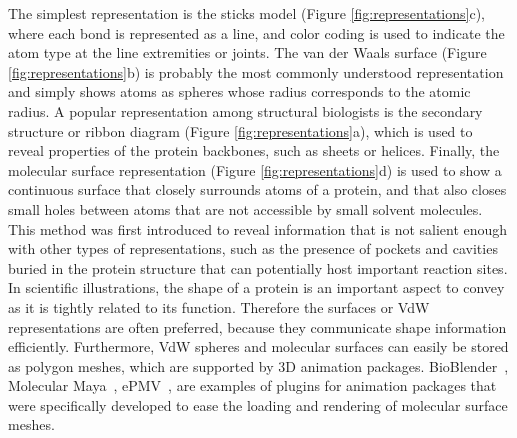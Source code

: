 %	
%	
%	

The simplest representation is the sticks model (Figure \ref{fig:representations}c), where each bond is represented as a line, and color coding is used to indicate the atom type at the line extremities or joints.
The van der Waals surface (Figure \ref{fig:representations}b) is probably the most commonly understood representation and simply shows atoms as spheres whose radius corresponds to the atomic radius.
A popular representation among structural biologists is the secondary structure or ribbon diagram (Figure \ref{fig:representations}a), which is used to reveal properties of the protein backbones, such as sheets or helices.
Finally, the molecular surface representation (Figure \ref{fig:representations}d) is used to show a continuous surface that closely surrounds atoms of a protein, and that also closes small holes between atoms that are not accessible by small solvent molecules.
This method was first introduced to reveal information that is not salient enough with other types of representations, such as the presence of pockets and cavities buried in the protein structure that can potentially host important reaction sites.
In scientific illustrations, the shape of a protein is an important aspect to convey as it is tightly related to its function.
Therefore the surfaces or VdW representations are often preferred, because they communicate shape information efficiently.
Furthermore, VdW spheres and molecular surfaces can easily be stored as polygon meshes, which are supported by 3D animation packages.
BioBlender~\cite{andrei2012intuitive}, Molecular Maya~\cite{mmaya}, ePMV~\cite{johnson2011epmv}, are examples of plugins for animation packages that were specifically developed to ease the loading and rendering of molecular surface meshes.

